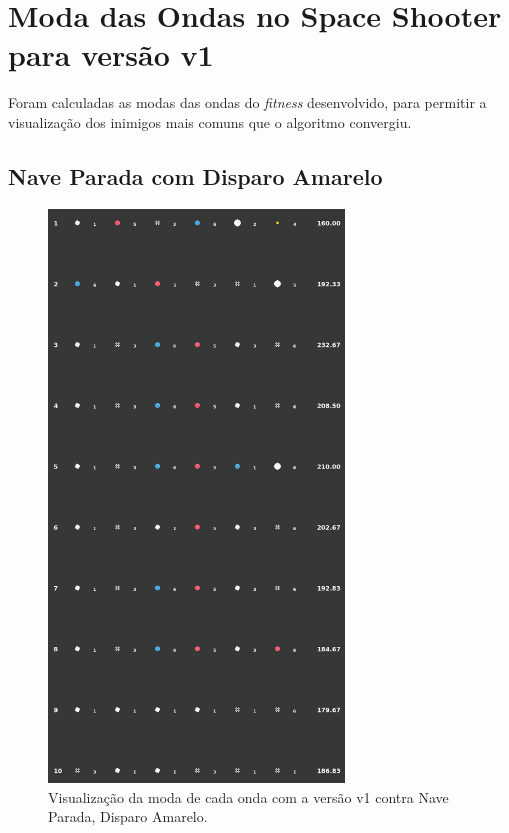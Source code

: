 \chapter{Moda das Ondas no Space Shooter para versão v1}
\label{sec:apend-moda-ss-v1}

Foram calculadas as modas das ondas do \textit{fitness} desenvolvido, para permitir a visualização dos inimigos mais comuns que o algoritmo convergiu.

\section{Nave Parada com Disparo Amarelo}
\label{sec:apend-moda-ss-ys-v1}

\begin{figure}[H]
  \centering
  \includegraphics[width=0.7\textwidth]{figuras/ss/ss_yellowstill_ai_mode_1_1.png}
  \caption{Visualização da moda de cada onda com a versão v1 contra Nave Parada, Disparo Amarelo.}
  \label{fig:ss-moda-ys-1-1}
\end{figure}

